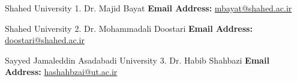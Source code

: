 

\begin{cventries}

  \cventry
    {Shahed University} 
    {1. Dr. Majid Bayat} 
    {}
    {}
    {\textbf{Email Address:} \href{mailto:mbayat@shahed.ac.ir}{mbayat@shahed.ac.ir}}
  
  \cventry
    {Shahed University} 
    {2. Dr. Mohammadali Doostari} 
    {}
    {}
    {\textbf{Email Address:} \href{mailto:doostari@shahed.ac.ir}{doostari@shahed.ac.ir}}

  \cventry
    {Sayyed Jamaleddin Asadabadi University} 
    {3. Dr. Habib Shahbazi} 
    {}
    {}
    {\textbf{Email Address:} \href{mailto:hashahbzai@ut.ac.ir}{hashahbzai@ut.ac.ir}}
\end{cventries}
